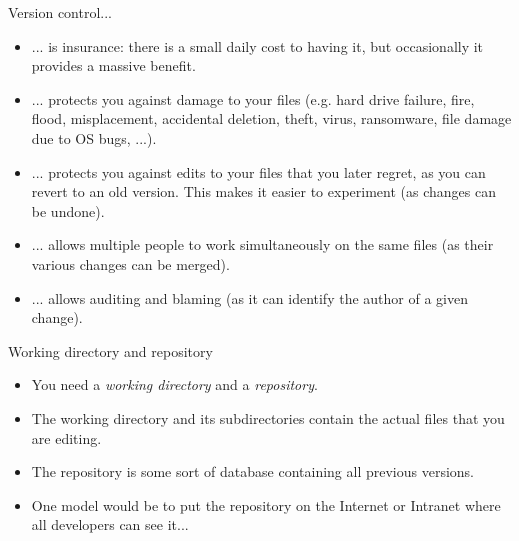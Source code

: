 \documentclass[usenames,dvipsnames]{beamer}
\begin{document}
\begin{frame}{Version control...}
  \begin{block}{}
    \begin{itemize}
      \item{... is insurance: there is a small daily cost to having it, but occasionally it provides a massive benefit.}
      \item{... protects you against damage to your files (e.g. hard drive failure, fire, flood, misplacement, accidental deletion, theft, virus, ransomware, file damage due to OS bugs, ...).}
      \item{... protects you against edits to your files that you later regret, as you can revert to an old version. This makes it easier to experiment (as changes can be undone).}
      \item{... allows multiple people to work simultaneously on the same files (as their various changes can be merged).}
      \item{... allows auditing and blaming (as it can identify the author of a given change).}
    \end{itemize}
  \end{block}
\end{frame}


\begin{frame}{Working directory and repository}
  \begin{block}{}
    \begin{itemize}
      \item{You need a \textit{working directory} and a \textit{repository}.}
      \item{The working directory and its subdirectories contain the actual files that you are editing.}
      \item{The repository is some sort of database containing all previous versions.}
      \item{One model would be to put the repository on the Internet or Intranet where all developers can see it...}
    \end{itemize}
  \end{block}
\end{frame}
\end{document}
